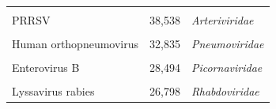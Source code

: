 \documentclass[landscape]{slides}
\begin{document}
\begin{slide}
\begin{center}
\begin{tabular}{lrl}
& & \\
PRRSV                     &       38,538 & \emph{Arteriviridae}    \\ %
& & \\
Human orthopneumovirus    &       32,835 & \emph{Pneumoviridae}    \\ %
& & \\
Enterovirus B             &       28,494 & \emph{Picornaviridae}   \\ %
& & \\
Lyssavirus rabies         &       26,798 & \emph{Rhabdoviridae}    \\ %
\end{tabular}

\vfill

\end{center}
\end{slide}
\end{document}
